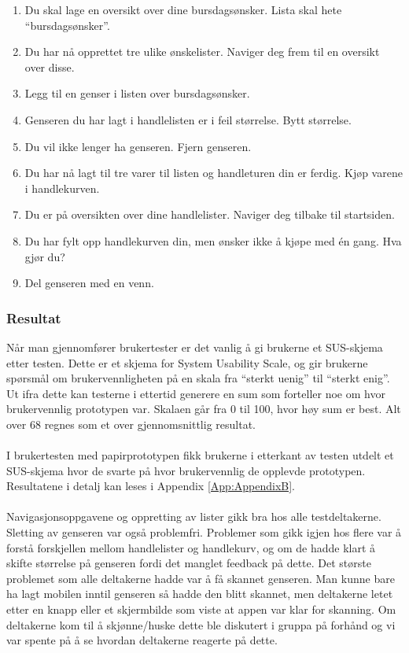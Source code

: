 \begin{enumerate}
    \item Du skal lage en oversikt over dine bursdagsønsker. Lista skal hete “bursdagsønsker”.
    \item Du har nå opprettet tre ulike ønskelister. Naviger deg frem til en oversikt over disse.
    \item Legg til en genser i listen over bursdagsønsker. 
    \item Genseren du har lagt i handlelisten er i feil størrelse. Bytt størrelse.
    \item Du vil ikke lenger ha genseren. Fjern genseren.
    \item Du har nå lagt til tre varer til listen og handleturen din er ferdig. Kjøp varene i handlekurven.
    \item Du er på oversikten over dine handlelister. Naviger deg tilbake til startsiden.
    \item Du har fylt opp handlekurven din, men ønsker ikke å kjøpe med én gang. Hva gjør du?
    \item Del genseren med en venn.
\end{enumerate}

\subsubsection{Resultat}
Når man gjennomfører brukertester er det vanlig å gi brukerne et SUS-skjema etter testen. Dette er et skjema for System Usability Scale, og gir brukerne spørsmål om brukervennligheten på en skala fra “sterkt uenig” til “sterkt enig”\cite{usability}. Ut ifra dette kan testerne i ettertid generere en sum som forteller noe om hvor brukervennlig prototypen var. Skalaen går fra 0 til 100, hvor høy sum er best. Alt over 68 regnes som et over gjennomsnittlig resultat.
\\\\
I brukertesten med papirprototypen fikk brukerne i etterkant av testen utdelt et SUS-skjema hvor de svarte på hvor brukervennlig de opplevde prototypen. Resultatene i detalj kan leses i Appendix \ref{App:AppendixB}.
\\\\
Navigasjonsoppgavene og oppretting av lister gikk bra hos alle testdeltakerne. Sletting av genseren var også problemfri. Problemer som gikk igjen hos flere var å forstå forskjellen mellom handlelister og handlekurv, og om de hadde klart å skifte størrelse på genseren fordi det manglet feedback på dette. Det største problemet som alle deltakerne hadde var å få skannet genseren. Man kunne bare ha lagt mobilen inntil genseren så hadde den blitt skannet, men deltakerne letet etter en knapp eller et skjermbilde som viste at appen var klar for skanning. Om deltakerne kom til å skjønne/huske dette ble diskutert i gruppa på forhånd og vi var spente på å se hvordan deltakerne reagerte på dette.

